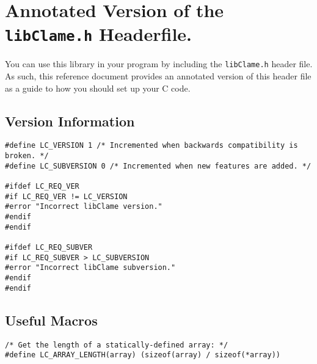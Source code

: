 %
%
%

\section{Annotated Version of the \texttt{libClame.h} Headerfile.}

You can use this library in your program by including the \texttt{libClame.h} header file. As such, this reference document provides an annotated version of this header file as a guide to how you should set up your C code.

\subsection{Version Information}

\begin{verbatim}
#define LC_VERSION 1 /* Incremented when backwards compatibility is broken. */
#define LC_SUBVERSION 0 /* Incremented when new features are added. */

#ifdef LC_REQ_VER
#if LC_REQ_VER != LC_VERSION
#error "Incorrect libClame version."
#endif
#endif

#ifdef LC_REQ_SUBVER
#if LC_REQ_SUBVER > LC_SUBVERSION
#error "Incorrect libClame subversion."
#endif
#endif
\end{verbatim}

\subsection{Useful Macros}

\begin{verbatim}
/* Get the length of a statically-defined array: */
#define LC_ARRAY_LENGTH(array) (sizeof(array) / sizeof(*array))
\end{verbatim}

